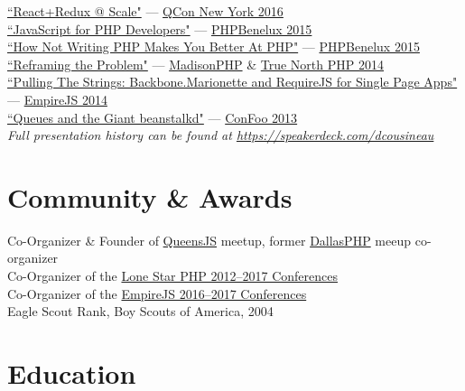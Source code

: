 \documentclass{resume}
\begin{document}
\begin{spacing}{1.25}
\href{https://speakerdeck.com/dcousineau/react-plus-redux-at-scale}{``React+Redux @ Scale"} --- \href{https://qconnewyork.com/ny2017/presentation/reactredux-scale-talk}{QCon New York 2016}\\
\href{https://speakerdeck.com/dcousineau/javascript-for-php-developers}{``JavaScript for PHP Developers"} --- \href{https://conference.phpbenelux.eu/2015/}{PHPBenelux 2015}\\
\href{https://speakerdeck.com/dcousineau/how-not-writing-php-makes-you-better-at-php}{``How Not Writing PHP Makes You Better At PHP"} --- \href{https://conference.phpbenelux.eu/2015/}{PHPBenelux 2015}\\
\href{https://speakerdeck.com/dcousineau/reframing-the-problem-truenorthphp-2014}{``Reframing the Problem"} --- \href{http://2014.madisonphpconference.com/schedule/view/19/reframing-the-problem-daniel-cousineau}{MadisonPHP} \& \href{http://truenorthphp.ca/}{True North PHP 2014}\\
\href{https://speakerdeck.com/dcousineau/pulling-the-strings-backbone-dot-marionette-and-require-dot-js-for-single-page-apps}{``Pulling The Strings: Backbone.Marionette and RequireJS for Single Page Apps"} --- \href{http://2014.empirejs.org/#/speakers}{EmpireJS 2014}\\
\href{https://speakerdeck.com/dcousineau/queues-and-the-giant-beanstalkd}{``Queues and the Giant beanstalkd"} --- \href{http://confoo.ca/}{ConFoo 2013}\\
\emph{Full presentation history can be found at \href{https://speakerdeck.com/dcousineau}{https://speakerdeck.com/dcousineau}}
\end{spacing}

\section{Community \& Awards}

Co-Organizer \& Founder of \href{http://queensjs.com/}{QueensJS} meetup, former \href{http://www.meetup.com/dallasphp/}{DallasPHP} meeup co-organizer
\\
Co-Organizer of the \href{http://lonestarphp.com/}{Lone Star PHP 2012--2017 Conferences}
\\
Co-Organizer of the \href{http://empirejs.org/}{EmpireJS 2016--2017 Conferences}
\\
Eagle Scout Rank, Boy Scouts of America, 2004

\section{Education}

\end{document}
